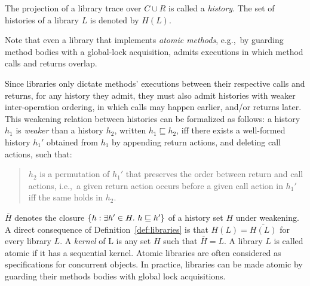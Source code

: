 The projection of a library trace over $C\cup R$ is called a \emph{history}. The set of histories of a library $L$ is denoted by $H(L)$.

Note that even a library that implements \emph{atomic methods}, e.g.,~by
guarding method bodies with a global-lock acquisition, admits executions in
which method calls and returns overlap. 

Since libraries only dictate methods’ executions between their respective calls and returns, for any history they admit, they must also 
admit histories with weaker inter-operation ordering, in which calls may happen earlier, and/or returns later. This weakening relation
between histories can be formalized as follows: a history $h_1$ is \emph{weaker} than a history $h_2$, written $h_1 \sqsubseteq h_2$, 
if{f} there exists a well-formed history $h_1'$
obtained from $h_1$ by appending return actions, and deleting call actions,
such that:
\begin{quote}

  $h_2$ is a permutation of $h_1'$ that preserves the order between
  return and call actions, i.e.,~a given return action occurs before a given
  call action in $h_1'$ if{f} the same holds in $h_2$.

\end{quote}
$\overline{H}$ denotes the closure ${\{ h: \exists h' \in H.\ h \sqsubseteq h' \}}$ of a 
history set $H$ under weakening.
A direct consequence of Definition~\ref{def:libraries} is that $H(L)=\overline{H(L)}$ for
every library $L$. A \emph{kernel} of L is any set $H$ such that $\overline{H} = L$.
A library $L$ is called atomic if it has a sequential kernel. 
Atomic libraries are often considered as specifications for concurrent objects. 
In practice, libraries can be made atomic by guarding their methods bodies with global lock acquisitions.


%
%
%  




